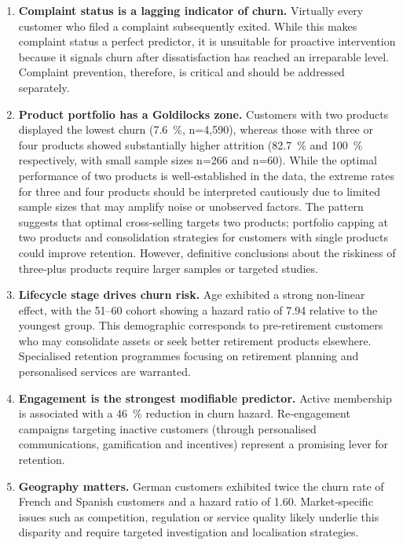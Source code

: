 \documentclass[12pt]{article}
\begin{document}
\begin{enumerate}
  \item \textbf{Complaint status is a lagging indicator of churn.}  Virtually every customer who filed a complaint subsequently exited.  While this makes complaint status a perfect predictor, it is unsuitable for proactive intervention because it signals churn after dissatisfaction has reached an irreparable level.  Complaint prevention, therefore, is critical and should be addressed separately.

  \item \textbf{Product portfolio has a Goldilocks zone.}  Customers with two products displayed the lowest churn (7.6~\%, n=4,590), whereas those with three or four products showed substantially higher attrition (82.7~\% and 100~\% respectively, with small sample sizes n=266 and n=60).  While the optimal performance of two products is well‑established in the data, the extreme rates for three and four products should be interpreted cautiously due to limited sample sizes that may amplify noise or unobserved factors.  The pattern suggests that optimal cross‑selling targets two products; portfolio capping at two products and consolidation strategies for customers with single products could improve retention.  However, definitive conclusions about the riskiness of three‑plus products require larger samples or targeted studies.

  \item \textbf{Lifecycle stage drives churn risk.}  Age exhibited a strong non‑linear effect, with the 51–60 cohort showing a hazard ratio of 7.94 relative to the youngest group.  This demographic corresponds to pre‑retirement customers who may consolidate assets or seek better retirement products elsewhere.  Specialised retention programmes focusing on retirement planning and personalised services are warranted.

  \item \textbf{Engagement is the strongest modifiable predictor.}  Active membership is associated with a 46~\% reduction in churn hazard.  Re‑engagement campaigns targeting inactive customers (through personalised communications, gamification and incentives) represent a promising lever for retention.

  \item \textbf{Geography matters.}  German customers exhibited twice the churn rate of French and Spanish customers and a hazard ratio of 1.60.  Market‑specific issues such as competition, regulation or service quality likely underlie this disparity and require targeted investigation and localisation strategies.
\end{enumerate}
\end{document}
